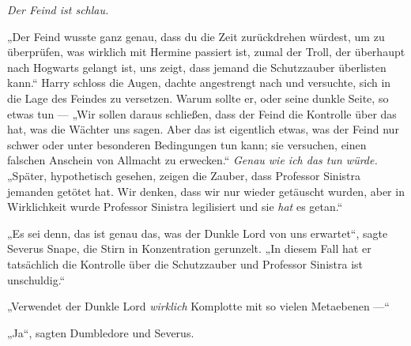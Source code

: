 \emph{Der Feind ist schlau.}

„Der Feind wusste ganz genau, dass du die Zeit zurückdrehen würdest, um zu überprüfen, was wirklich mit Hermine passiert ist, zumal der Troll, der überhaupt nach Hogwarts gelangt ist, uns zeigt, dass jemand die Schutzzauber überlisten kann.“ Harry schloss die Augen, dachte angestrengt nach und versuchte, sich in die Lage des Feindes zu versetzen. Warum sollte er, oder seine dunkle Seite, so etwas tun —
„Wir sollen daraus schließen, dass der Feind die Kontrolle über das hat, was die Wächter uns sagen. Aber das ist eigentlich etwas, was der Feind nur schwer oder unter besonderen Bedingungen tun kann; sie versuchen, einen falschen Anschein von Allmacht zu erwecken.“ \emph{Genau wie ich das tun würde.}
„Später, hypothetisch gesehen, zeigen die Zauber, dass Professor Sinistra jemanden getötet hat. Wir denken, dass wir nur wieder getäuscht wurden, aber in Wirklichkeit wurde Professor Sinistra legilisiert und sie \emph{hat} es getan.“

„Es sei denn, das ist genau das, was der Dunkle Lord von uns erwartet“, sagte Severus Snape, die Stirn in Konzentration gerunzelt.
„In diesem Fall hat er tatsächlich die Kontrolle über die Schutzzauber und Professor Sinistra ist unschuldig.“

„Verwendet der Dunkle Lord \emph{wirklich} Komplotte mit so vielen Metaebenen —“

„Ja“, sagten Dumbledore und Severus.

